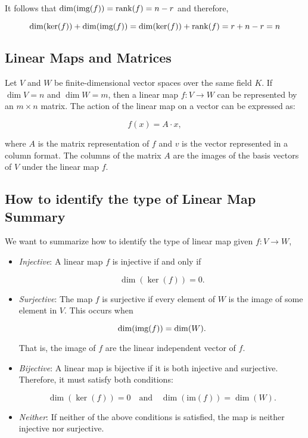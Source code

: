 It follows that \(\dim(\text{img}(f)) = \text{rank}(f) = n - r\) and therefore,
    
\[
    \dim(\ker(f)) + \dim(\text{img}(f)) = \dim(\ker(f)) + \text{rank}(f) = r + n - r = n
\]

\QED
  
\subsection{Linear Maps and Matrices}

Let \( V \) and \( W \) be finite-dimensional vector spaces over the same field \( K \). 
If \( \dim V = n \) and \( \dim W = m \), then a linear map \( f: V \to W \) can be represented by 
an \( m \times n \) matrix. The action of the linear map on a vector can be expressed as:

\[
    f(x) = A \cdot x,
\]

where \(A\) is the matrix representation of \(f\) and \( v \) is the vector represented in a column 
format. The columns of the matrix \(A\) are the images of the basis vectors of \( V \) under the linear 
map \(f\).

\subsection{How to identify the type of Linear Map Summary}

We want to summarize how to identify the type of linear map given \( f: V \to W \),

\begin{itemize}

    \item \emph{Injective}: A linear map \( f \) is injective if and only if

    \[
        \dim(\ker(f)) = 0.
    \]

    \item \emph{Surjective}: The map \( f \) is surjective if every element of \( W \) is the 
    image of some element in \( V \). This occurs when

    \[
        \dim(\text{img}(f)) = \dim(W).
    \]

    That is, the image of \( f \) are the linear independent vector of \(f\).

    \item \emph{Bijective}: A linear map is bijective if it is both injective and surjective. 
    Therefore, it must satisfy both conditions:
    
    \[
        \dim(\ker(f)) = 0 \quad \text{and} \quad \dim(\text{im}(f)) = \dim(W).
    \]
    
    \item \emph{Neither}: If neither of the above conditions is satisfied, the map is neither injective 
    nor surjective.

\end{itemize}


